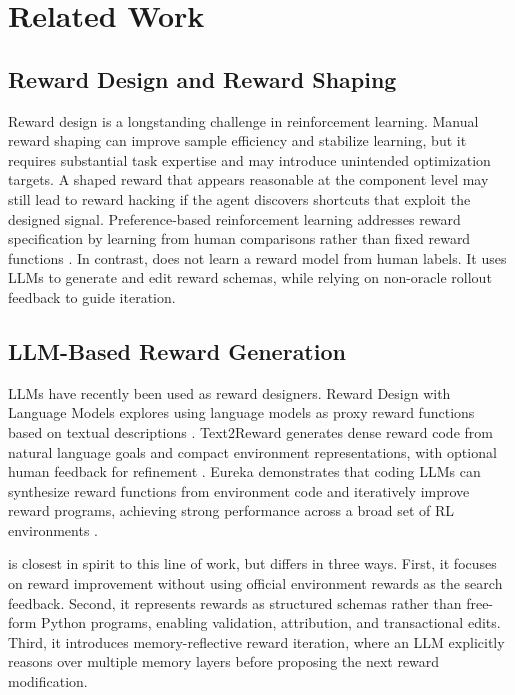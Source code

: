 \section{Related Work}

\subsection{Reward Design and Reward Shaping}

Reward design is a longstanding challenge in reinforcement learning. Manual reward shaping can improve sample efficiency and stabilize learning, but it requires substantial task expertise and may introduce unintended optimization targets. A shaped reward that appears reasonable at the component level may still lead to reward hacking if the agent discovers shortcuts that exploit the designed signal. Preference-based reinforcement learning addresses reward specification by learning from human comparisons rather than fixed reward functions \cite{christiano2017deep}. In contrast, \methodname{} does not learn a reward model from human labels. It uses LLMs to generate and edit reward schemas, while relying on non-oracle rollout feedback to guide iteration.

\subsection{LLM-Based Reward Generation}

LLMs have recently been used as reward designers. Reward Design with Language Models explores using language models as proxy reward functions based on textual descriptions \cite{kwon2023rewarddesign}. Text2Reward generates dense reward code from natural language goals and compact environment representations, with optional human feedback for refinement \cite{xie2023text2reward}. Eureka demonstrates that coding LLMs can synthesize reward functions from environment code and iteratively improve reward programs, achieving strong performance across a broad set of RL environments \cite{ma2023eureka}.

\methodname{} is closest in spirit to this line of work, but differs in three ways. First, it focuses on reward improvement without using official environment rewards as the search feedback. Second, it represents rewards as structured schemas rather than free-form Python programs, enabling validation, attribution, and transactional edits. Third, it introduces memory-reflective reward iteration, where an LLM explicitly reasons over multiple memory layers before proposing the next reward modification.

